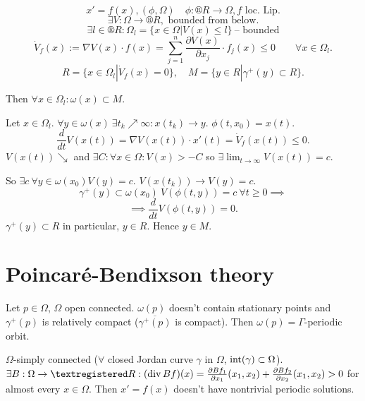 \documentclass[12pt]{article}					%
\begin{document}
\begin{veta}
	$$ x' = f(x), (\phi, \Omega) \quad \phi: ®R \rightarrow \Omega, f \text{ loc. Lip.} $$
	$$ \exists V: \Omega \rightarrow ®R, \text{ bounded from below}. $$
	$$ \exists l \in ®R: \Omega_l = \{x \in \Omega | V(x) ≤ l\}\ – \text{ bounded} $$
	$$ \dot{V}_f(x) := \nabla V(x) · f(x) = \sum_{j=1}^n  \frac{\partial V(x)}{\partial x_j}·f_j(x) ≤ 0 \qquad \forall x \in \Omega_l. $$
	$$ R = \{x \in \Omega_l | \dot{V}_f(x) = 0\}, \quad M = \{y \in R | \gamma^+(y) \subset R\}. $$

	Then $\forall x \in \Omega_l: \omega(x) \subset M$.

	\begin{dukazin}
		Let $x \in \Omega_l$. $\forall y \in \omega(x)\ \exists t_k \nearrow ∞: x(t_k) \rightarrow y$. $\phi(t, x_0) = x(t)$.
		$$ \frac{d}{dt} V(x(t)) = \nabla V(x(t))·x'(t) = \dot{V}_f(x(t)) ≤ 0. $$
		$V(x(t)) \searrow$ and $\exists C: \forall x \in \Omega: V(x) > -C$ so $\exists \lim_{t \rightarrow ∞} V(x(t)) = c$.

		So $\exists c\ \forall y \in \omega(x_0) V(y) = c$. $V(x(t_k)) \rightarrow V(y) = c$.
		$$ \gamma^+(y) \subset \omega(x_0)\ V(\phi(t, y)) = c\ \forall t ≥ 0 \implies $$
		$$ \implies \frac{d}{dt}V(\phi(t, y)) = 0. $$
		$\gamma^+(y) \subset R$ in particular, $y \in R$. Hence $y \in M$.
	\end{dukazin}
\end{veta}

\section{Poincaré-Bendixson theory}
\begin{veta}
	Let $p \in \Omega$, $\Omega$ open connected. $\omega(p)$ doesn't contain stationary points and $\gamma^+(p)$ is relatively compact ($\overline{\gamma^+(p)}$ is compact). Then $\omega(p) = \Gamma$-periodic orbit.
\end{veta}

\begin{veta}
	$\Omega$-simply connected ($\forall$ closed Jordan curve $\gamma$ in $\Omega$, $\operatorname{int}(\gamma) \subset \Omega$). $\exists B: \Omega \rightarrow ®R: (\Div Bf)(x) = \frac{\partial Bf_1}{\partial x_1}(x_1, x_2) + \frac{\partial Bf_2}{\partial x_2}(x_1, x_2) > 0$ for almost every $x \in \Omega$. Then $x' = f(x)$ doesn't have nontrivial periodic solutions.
\end{veta}
\end{document}

